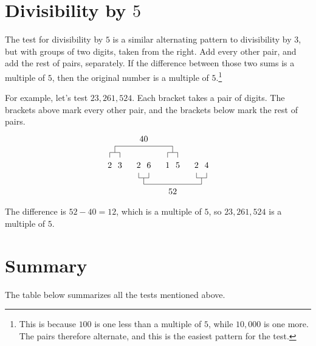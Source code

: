 \section{Divisibility by $5$}

The test for divisibility by $5$ is a similar alternating pattern to divisibility by $3$, but with groups of two digits, taken from the right. Add every other pair, and add the rest of pairs, separately. If the difference between those two sums is a multiple of $5$, then the original number is a multiple of $5$.\footnote{This is because $100$ is one less than a multiple of $5$, while $10{,}000$ is one more. The pairs therefore alternate, and this is the easiest pattern for the test.}

For example, let's test $23{,}261{,}524$. Each bracket takes a pair of digits. The brackets above mark every other pair, and the brackets below mark the rest of pairs.
\[
  \setlength{\unitlength}{1em}
  \begin{picture}(12.4,7.5)(-0.5,-3.7)
    \put(0,0){\makebox(0,0){$2$}}
    \put(1.2,0){\makebox(0,0){$3$}}
    \put(3.4,0){\makebox(0,0){$2$}}
    \put(4.6,0){\makebox(0,0){$6$}}
    \put(6.8,0){\makebox(0,0){$1$}}
    \put(8.0,0){\makebox(0,0){$5$}}
    \put(10.2,0){\makebox(0,0){$2$}}
    \put(11.4,0){\makebox(0,0){$4$}}
    \put(0,0.9){\line(0,1){0.6}}
    \put(1.2,0.9){\line(0,1){0.6}}
    \put(0,1.5){\line(1,0){1.2}}
    \put(0.6,1.5){\line(0,1){0.75}}
    \put(6.8,0.9){\line(0,1){0.6}}
    \put(8.0,0.9){\line(0,1){0.6}}
    \put(6.8,1.5){\line(1,0){1.2}}
    \put(7.4,1.5){\line(0,1){0.75}}
    \put(0.6,2.25){\line(1,0){6.8}}
    \put(4.0,3.1){\makebox(0,0){$40$}}
    \put(3.4,-0.9){\line(0,-1){0.6}}
    \put(4.6,-0.9){\line(0,-1){0.6}}
    \put(3.4,-1.5){\line(1,0){1.2}}
    \put(4.0,-1.5){\line(0,-1){0.75}}
    \put(10.2,-0.9){\line(0,-1){0.6}}
    \put(11.4,-0.9){\line(0,-1){0.6}}
    \put(10.2,-1.5){\line(1,0){1.2}}
    \put(10.8,-1.5){\line(0,-1){0.75}}
    \put(4.0,-2.25){\line(1,0){6.8}}
    \put(7.4,-3.1){\makebox(0,0){$52$}}
  \end{picture}
\]
The difference is $52 - 40 = 12$, which is a multiple of $5$, so $23{,}261{,}524$ is a multiple of $5$.

\section{Summary}

The table below summarizes all the tests mentioned above.

